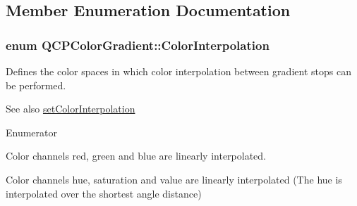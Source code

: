 \subsection{Member Enumeration Documentation}
\subsubsection[{\texorpdfstring{Color\+Interpolation}{ColorInterpolation}}]{\setlength{\rightskip}{0pt plus 5cm}enum {\bf Q\+C\+P\+Color\+Gradient\+::\+Color\+Interpolation}}\hypertarget{classQCPColorGradient_ac5dca17cc24336e6ca176610e7f77fc1}{}\label{classQCPColorGradient_ac5dca17cc24336e6ca176610e7f77fc1}
Defines the color spaces in which color interpolation between gradient stops can be performed.

\begin{DoxySeeAlso}{See also}
\hyperlink{classQCPColorGradient_aa13fda86406e1d896a465a409ae63b38}{set\+Color\+Interpolation} 
\end{DoxySeeAlso}
\begin{Desc}
\item[Enumerator]\par
\begin{description}
\item[{\em 
ci\+R\+GB\hypertarget{classQCPColorGradient_ac5dca17cc24336e6ca176610e7f77fc1a5e30f725c9cfe93999e268a9f92afbe7}{}\label{classQCPColorGradient_ac5dca17cc24336e6ca176610e7f77fc1a5e30f725c9cfe93999e268a9f92afbe7}
}]Color channels red, green and blue are linearly interpolated. \item[{\em 
ci\+H\+SV\hypertarget{classQCPColorGradient_ac5dca17cc24336e6ca176610e7f77fc1af14ae62fcae11ecc07234eeaec5856cb}{}\label{classQCPColorGradient_ac5dca17cc24336e6ca176610e7f77fc1af14ae62fcae11ecc07234eeaec5856cb}
}]Color channels hue, saturation and value are linearly interpolated (The hue is interpolated over the shortest angle distance) \end{description}
\end{Desc}
